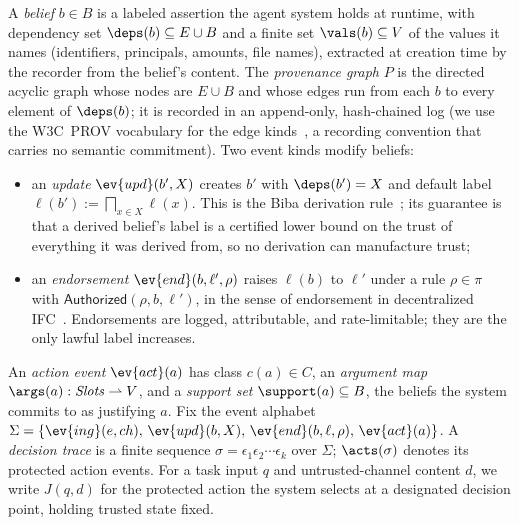 \begin{definition}
\label{def:beliefs}
A \emph{belief} $b \in B$ is a labeled assertion the agent system holds
at runtime, with dependency set $\deps(b) \subseteq E \cup B$ and a
finite set $\vals(b) \subseteq V$ of the values it names (identifiers,
principals, amounts, file names), extracted at creation time by the
recorder from the belief's content. The \emph{provenance graph} $P$ is
the directed acyclic graph whose nodes are $E \cup B$ and whose edges
run from each $b$ to every element of $\deps(b)$; it is recorded in an
append-only, hash-chained log (we use the W3C~PROV vocabulary for the
edge kinds~\cite{prov}, a recording convention that carries no semantic
commitment). Two event kinds modify beliefs:
\begin{itemize}[leftmargin=1.15em,itemsep=1pt]
\item an \emph{update} $\ev{upd}(b', X)$ creates $b'$ with
$\deps(b') = X$ and default label
$\ell(b') := \bigsqcap_{x \in X} \ell(x)$. This is the Biba derivation
rule~\cite{biba}; its guarantee is that a derived belief's label is a
certified lower bound on the trust of everything it was derived from,
so no derivation can manufacture trust;
\item an \emph{endorsement} $\ev{end}(b, \ell', \rho)$ raises
$\ell(b)$ to $\ell'$ under a rule $\rho \in \pi$ with
$\mathsf{Authorized}(\rho, b, \ell')$, in the sense of endorsement in
decentralized IFC~\cite{myersliskov}. Endorsements are logged,
attributable, and rate-limitable; they are the only lawful label
increases.
\end{itemize}
\end{definition}

\begin{definition}
\label{def:actions}
An \emph{action event} $\ev{act}(a)$ has class $c(a) \in C$, an
\emph{argument map} $\args(a) : \mathit{Slots} \rightharpoonup V$, and a
\emph{support set} $\support(a) \subseteq B$, the beliefs the system
commits to as justifying $a$. Fix the event alphabet
$\Sigma = \{ \ev{ing}(e, ch),\, \ev{upd}(b, X),\, \ev{end}(b, \ell, \rho),\, \ev{act}(a) \}$.
A \emph{decision trace} is a finite sequence
$\sigma = \epsilon_1 \epsilon_2 \cdots \epsilon_k$ over $\Sigma$;
$\acts(\sigma)$ denotes its protected action events. For a task input
$q$ and untrusted-channel content $d$, we write $J(q, d)$ for the
protected action the system selects at a designated decision point,
holding trusted state fixed.
\end{definition}

